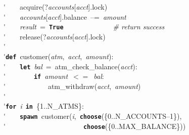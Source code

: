 \'\>~~~~acquire(?\textit{accounts}[\textit{acct}].lock)\\

\'\>~~~~\textit{accounts}[\textit{acct}].balance~--=~\textit{amount}\\

\'\>~~~~\textit{result}~=~\texttt{\textbf{True}}~~~~~~~~~~~~~~\emph{\# return success}\\

\'\>~~~~release(?\textit{accounts}[\textit{acct}].lock)\\

\'\>\\

\'\>\texttt{\textbf{def}}~customer(\textit{atm},~\textit{acct},~\textit{amount}):\\

\'\>~~~~\texttt{\textbf{let}}~\textit{bal}~=~atm\_check\_balance(\textit{acct}):\\

\'\>~~~~~~~~\texttt{\textbf{if}}~\textit{amount}~$<=$~\textit{bal}:\\

\'\>~~~~~~~~~~~~atm\_withdraw(\textit{acct},~\textit{amount})\\

\'\>~~~~~~~~\\

\'\>\texttt{\textbf{for}}~\textit{i}~\texttt{\textbf{in}}~\{1..N\_ATMS\}:\\

\'\>~~~~\texttt{\textbf{spawn}}~customer(\textit{i},~\texttt{\textbf{choose}}(\{0..N\_ACCOUNTS--1\}),\\

\'\>~~~~~~~~~~~~~~~~~~~~~~\texttt{\textbf{choose}}(\{0..MAX\_BALANCE\}))